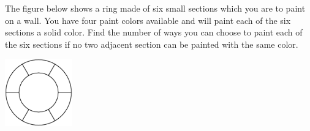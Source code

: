 The figure below shows a ring made of six small sections which you are to paint on a wall. You have four paint colors available and will paint each of the six sections a solid color. Find the number of ways you can choose to paint each of the six sections if no two adjacent section can be painted with the same color.

\begin{center}
\includegraphics[width = 29.0mm]{img/fig0.png}
\end{center}